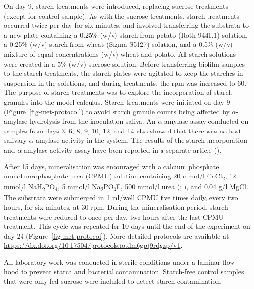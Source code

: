 \documentclass[
  b5paper,
]{book}
\begin{document}
On day 9, starch treatments were introduced, replacing sucrose
treatments (except for control sample). As with the sucrose treatments,
starch treatments occurred twice per day for six minutes, and involved
transferring the substrata to a new plate containing a 0.25\% (w/v)
starch from potato (Roth 9441.1) solution, a 0.25\% (w/v) starch from
wheat (Sigma S5127) solution, and a 0.5\% (w/v) mixture of equal
concentrations (w/v) wheat and potato. All starch solutions were created
in a 5\% (w/v) sucrose solution. Before transferring biofilm samples to
the starch treatments, the starch plates were agitated to keep the
starches in suspension in the solutions, and during treatments, the rpm
was increased to 60. The purpose of starch treatments was to explore the
incorporation of starch granules into the model calculus. Starch
treatments were initiated on day 9 (Figure~\ref{fig-met-protocol}) to
avoid starch granule counts being affected by \(\alpha\)-amylase
hydrolysis from the inoculation saliva. An \(\alpha\)-amylase assay
conducted on samples from days 3, 6, 8, 9, 10, 12, and 14 also showed
that there was no host salivary \(\alpha\)-amylase activity in the
system. The results of the starch incorporation and \(\alpha\)-amylase
activity assay have been reported in a separate article
().

After 15 days, mineralisation was encouraged with a calcium phosphate
monofluorophosphate urea (CPMU) solution containing 20 mmol/l
CaCl\textsubscript{2}, 12 mmol/l
NaH\textsubscript{2}PO\textsubscript{4}, 5 mmol/l
Na\textsubscript{2}PO\textsubscript{3}F, 500 mmol/l urea
(; ), and 0.04 g/l MgCl. The substrata were submerged in 1 ml/well
CPMU five times daily, every two hours, for six minutes, at 30 rpm.
During the mineralisation period, starch treatments were reduced to once
per day, two hours after the last CPMU treatment. This cycle was
repeated for 10 days until the end of the experiment on day 24
(Figure~\ref{fig-met-protocol}). More detailed protocols are available
at \url{https://dx.doi.org/10.17504/protocols.io.dm6gpj9rdgzp/v1}.

All laboratory work was conducted in sterile conditions under a laminar
flow hood to prevent starch and bacterial contamination. Starch-free
control samples that were only fed sucrose were included to detect
starch contamination.
\end{document}
